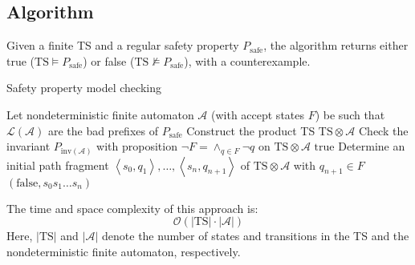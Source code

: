 \subsection{Algorithm}
Given a finite TS and a regular safety property $P_{\text{safe}}$, the algorithm returns either true ($\text{TS}\models P_{\text{safe}}$) or false ($\text{TS}\not\models P_{\text{safe}}$), with a counterexample. 
\begin{algorithm}[H]
    \caption{Safety property model checking}
        \begin{algorithmic}[1]
            \State Let nondeterministic finite automaton $\mathcal{A}$ (with accept states $F$) be such that $\mathcal{L}(\mathcal{A})$ are the bad prefixes of $P_{\text{safe}}$ 
            \State Construct the product TS $\text{TS}\otimes\mathcal{A}$
            \State Check the invariant $P_{\text{inv}(\mathcal{A})}$ with proposition $\lnot F=\wedge_{q \in F}\lnot q$ on $\text{TS}\otimes\mathcal{A}$
                \State \Return $\text{true}$
            \Else 
                \State Determine an initial path fragment $\left\langle s_0,q_1\right\rangle,\dots,\left\langle s_n,q_{n+1}\right\rangle$ of $\text{TS}\otimes\mathcal{A}$ with $q_{n+1}\in F$
                \State \Return $(\text{false}, s_0s_1\dots s_n)$
            \EndIf
        \end{algorithmic}
\end{algorithm}
\noindent The time and space complexity of this approach is:
\[\mathcal{O}(\left\lvert\text{TS}\right\rvert\cdot\left\lvert\mathcal{A}\right\rvert)\]
Here, $\left\lvert\text{TS}\right\rvert$ and $\left\lvert\mathcal{A}\right\rvert$ denote the number of states and transitions in the TS and the nondeterministic finite automaton, respectively.